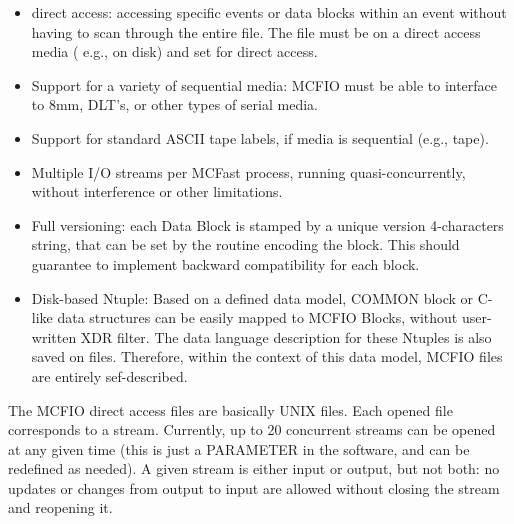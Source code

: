 \begin{itemize}
\item direct access:  accessing specific events or 
data blocks within an event without having to scan through the entire file.
The file must be on a direct access media ( e.g., on disk) and set for 
direct access.
\item  Support for a variety of sequential media: MCFIO must be able to 
interface to 8mm, DLT's, or other types of serial media.
\item  Support for 
standard ASCII tape labels, if media is sequential (e.g., tape).
\item  Multiple I/O streams per MCFast process, running quasi-concurrently, 
	without interference or other limitations. 
\item Full versioning: each Data 
Block is stamped by a unique version 4-characters string, that can be set
by the routine encoding the block. This should guarantee to implement 
backward compatibility for each block.
\item Disk-based Ntuple: Based on a defined data model, COMMON block or 
C-like data structures can be easily mapped to MCFIO Blocks, without 
user-written  XDR filter. The data language description for these Ntuples 
is also saved on files. Therefore, within the context of this data model, 
MCFIO files are entirely sef-described. 
\end{itemize}

The MCFIO direct access files are basically UNIX files. Each opened 
file corresponds to a stream. Currently, up to 20 concurrent 
streams can be opened at any given time (this is just a PARAMETER
in the software, and can be redefined as needed). A given stream is either 
input or output, but not both: no updates or changes from output to 
input are allowed without closing the stream and reopening it. 

